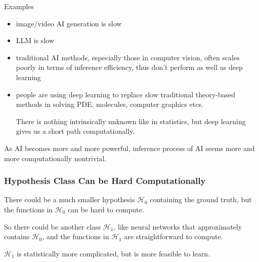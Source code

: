 \documentclass{beamer}   	%
\theoremstyle{definition}
\begin{document}
\begin{frame}
Examples
\begin{itemize}
	\item image/video AI generation is slow
	\item LLM is slow
	\item traditional AI methods, especially those in computer vision, often scales poorly in terms of inference efficiency, thus don't perform as well as deep learning
	\item people are using deep learning to replace slow traditional theory-based methods in solving PDE, molecules, computer graphics etcs.

	There is nothing intrinsically unknown like in statistics, but deep learning gives us a short path computationally.
\end{itemize}

As AI becomes more and more powerful, inference process of AI seems more and more computationally nontrivial.
\end{frame}

\begin{frame}
\frametitle{Hypothesis Class Can be Hard Computationally}

There could be a much smaller hypothesis $\mathcal{H}_0$ containing the ground truth, but the functions in $\mathcal{H}_0$ can be hard to compute.

So there could be another class $\mathcal{H}_1$, like neural networks that approximately contains $\mathcal{H}_0$, and the functions in $\mathcal{H}_1$ are straightforward to compute.

$\mathcal{H}_1$ is statistically more complicated, but is more feasible to learn.

\begin{center}
\end{center}
\end{frame}
\end{document}
